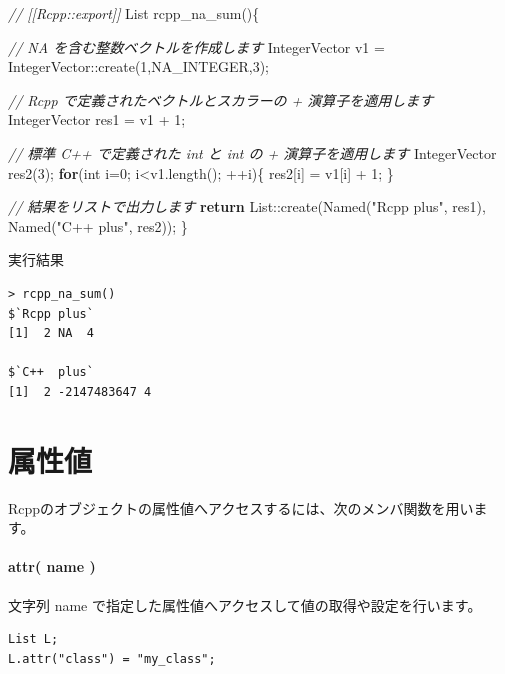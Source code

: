 \documentclass[]{book}
\newenvironment{Shaded}{\begin{snugshade}}{\end{snugshade}}
\newcommand{\CommentTok}[1]{\textcolor[rgb]{0.56,0.35,0.01}{\textit{#1}}}
\newcommand{\ControlFlowTok}[1]{\textcolor[rgb]{0.13,0.29,0.53}{\textbf{#1}}}
\newcommand{\DataTypeTok}[1]{\textcolor[rgb]{0.13,0.29,0.53}{#1}}
\newcommand{\DecValTok}[1]{\textcolor[rgb]{0.00,0.00,0.81}{#1}}
\newcommand{\NormalTok}[1]{#1}
\newcommand{\StringTok}[1]{\textcolor[rgb]{0.31,0.60,0.02}{#1}}
\begin{document}
\begin{Shaded}
\begin{Highlighting}[]
\CommentTok{// [[Rcpp::export]]}
\NormalTok{List rcpp_na_sum()\{}

    \CommentTok{// NA を含む整数ベクトルを作成します}
\NormalTok{    IntegerVector v1  = IntegerVector::create(}\DecValTok{1}\NormalTok{,NA_INTEGER,}\DecValTok{3}\NormalTok{);}

    \CommentTok{// Rcpp で定義されたベクトルとスカラーの + 演算子を適用します}
\NormalTok{    IntegerVector res1 = v1 + }\DecValTok{1}\NormalTok{;}

    \CommentTok{// 標準 C++ で定義された int と int の + 演算子を適用します}
\NormalTok{    IntegerVector res2(}\DecValTok{3}\NormalTok{);}
    \ControlFlowTok{for}\NormalTok{(}\DataTypeTok{int}\NormalTok{ i=}\DecValTok{0}\NormalTok{; i<v1.length(); ++i)\{}
\NormalTok{        res2[i] = v1[i] + }\DecValTok{1}\NormalTok{;}
\NormalTok{    \}}

    \CommentTok{// 結果をリストで出力します}
    \ControlFlowTok{return}\NormalTok{ List::create(Named(}\StringTok{"Rcpp plus"}\NormalTok{, res1),}
\NormalTok{                        Named(}\StringTok{"C++  plus"}\NormalTok{, res2));}
\NormalTok{\}}
\end{Highlighting}
\end{Shaded}

実行結果

\begin{verbatim}
> rcpp_na_sum()
$`Rcpp plus`
[1]  2 NA  4

$`C++  plus`
[1]  2 -2147483647 4
\end{verbatim}

\chapter{属性値}

Rcppのオブジェクトの属性値へアクセスするには、次のメンバ関数を用います。

\hypertarget{attr-name}{%
\subsubsection{attr( name )}\label{attr-name}}

文字列 name で指定した属性値へアクセスして値の取得や設定を行います。

\begin{verbatim}
List L;
L.attr("class") = "my_class";
\end{verbatim}
\end{document}
